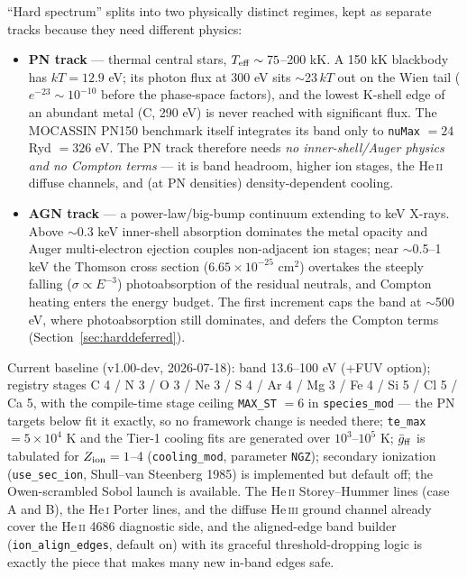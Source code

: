 \documentclass[english,a4paper]{my_memo}
\newcommand{\code}[1]{\texttt{#1}}
\newcommand{\HeI}{He\,\textsc{i}}
\newcommand{\HeII}{He\,\textsc{ii}}
\newcommand{\HeIII}{He\,\textsc{iii}}
\begin{document}
``Hard spectrum'' splits into two physically distinct regimes, kept as
separate tracks because they need different physics:

\begin{itemize}[leftmargin=2em]
\item \textbf{PN track} --- thermal central stars,
  $T_{\rm eff}\sim75$--200 kK.  A 150 kK blackbody has $kT=12.9$ eV; its
  photon flux at 300 eV sits $\sim$23\,$kT$ out on the Wien tail
  ($e^{-23}\sim10^{-10}$ before the phase-space factors), and the lowest
  K-shell edge of an abundant metal (C, 290 eV) is never reached with
  significant flux.  The MOCASSIN PN150 benchmark itself integrates its
  band only to \code{nuMax} $=24$ Ryd $=326$ eV.  The PN track therefore
  needs \emph{no inner-shell/Auger physics and no Compton terms} --- it
  is band headroom, higher ion stages, the \HeII{} diffuse channels, and
  (at PN densities) density-dependent cooling.
\item \textbf{AGN track} --- a power-law/big-bump continuum extending to
  keV X-rays.  Above $\sim$0.3 keV inner-shell absorption dominates the
  metal opacity and Auger multi-electron ejection couples non-adjacent
  ion stages; near $\sim$0.5--1 keV the Thomson cross section
  ($6.65\times10^{-25}$ cm$^2$) overtakes the steeply falling
  ($\sigma\propto E^{-3}$) photoabsorption of the residual neutrals, and
  Compton heating enters the energy budget.  The first increment caps
  the band at $\sim$500 eV, where photoabsorption still dominates, and
  defers the Compton terms (Section~\ref{sec:harddeferred}).
\end{itemize}

Current baseline (v1.00-dev, 2026-07-18): band 13.6--100 eV (+FUV
option); registry stages C 4 / N 3 / O 3 / Ne 3 / S 4 / Ar 4 / Mg 3 /
Fe 4 / Si 5 / Cl 5 / Ca 5, with the compile-time stage ceiling
\code{MAX\_ST} $=6$ in \code{species\_mod} --- the PN targets below fit
it exactly, so no framework change is needed there; \code{te\_max}
$=5\times10^4$ K and the Tier-1 cooling fits are generated over
$10^3$--$10^5$ K; $\bar g_{\rm ff}$ is tabulated for $Z_{\rm ion}=1$--4
(\code{cooling\_mod}, parameter \code{NGZ}); secondary ionization
(\code{use\_sec\_ion}, Shull--van Steenberg 1985) is implemented but
default off; the Owen-scrambled Sobol launch is available.  The \HeII{}
Storey--Hummer lines (case A and B), the \HeI{} Porter lines, and the
diffuse \HeIII{} ground channel already cover the \HeII{} 4686
diagnostic side, and the aligned-edge band builder
(\code{ion\_align\_edges}, default on) with its graceful
threshold-dropping logic is exactly the piece that makes many new
in-band edges safe.
\end{document}
